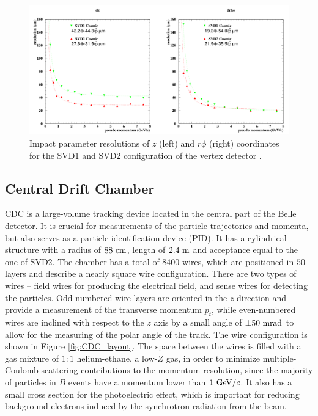 \begin{figure}[H]
	\centering
	\captionsetup{width=0.8\linewidth}
	\includegraphics[width=\linewidth]{fig/setup/SVD_performance_1}
	\caption{Impact parameter resolutions of $z$ (left) and $r\phi$ (right) coordinates for the SVD1 and SVD2 configuration of the vertex detector \cite{haba2004letter}.}
	\label{fig:SVD_performance}
\end{figure}


\subsection{Central Drift Chamber}

CDC is a large-volume tracking device located in the central part of the Belle detector. It is crucial for measurements of the particle trajectories and momenta, but also serves as a particle identification device (PID). It has a cylindrical structure with a radius of $88\mathrm{~cm}$, length of $2.4\mathrm{~m}$ and acceptance equal to the one of SVD2. The chamber has a total of $8400$ wires, which are positioned in $50$ layers and describe a nearly square wire configuration. There are two types of wires -- field wires for producing the electrical field, and sense wires for detecting the particles. Odd-numbered wire layers are oriented in the $z$ direction and provide a measurement of the transverse momentum $p_t$, while even-numbered wires are inclined with respect to the $z$ axis by a small angle of $\pm 50\mathrm{~mrad}$ to allow for the measuring of the polar angle of the track. The wire configuration is shown in Figure \ref{fig:CDC_layout}. The space between the wires is filled with a gas mixture of $1:1$ helium-ethane, a low-$Z$ gas, in order to minimize multiple-Coulomb scattering contributions to the momentum resolution, since the majority of particles in $B$ events have a momentum lower than $1\mathrm{~GeV}/c$. It also has a small cross section for the photoelectric effect, which is important for reducing background electrons induced by the synchrotron radiation from the beam. 

